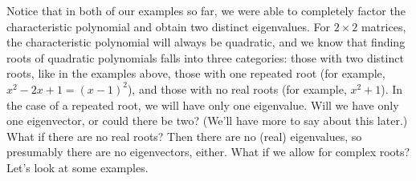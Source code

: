 \pagebreak

Notice that in both of our examples so far, we were able to completely factor the characteristic polynomial and obtain two distinct eigenvalues. For $2\times 2$ matrices, the characteristic polynomial will always be quadratic, and we know that finding roots of quadratic polynomials falls into three categories: those with two distinct roots, like in the examples above, those with one repeated root (for example, $x^2-2x+1=(x-1)^2$), and those with no real roots (for example, $x^2+1$). In the case of a repeated root, we will have only one eigenvalue. Will we have only one eigenvector, or could there be two? (We'll have more to say about this later.) What if there are no real roots? Then there are no (real) eigenvalues, so presumably there are no eigenvectors, either. What if we allow for complex roots? Let's look at some examples.



\medskip

